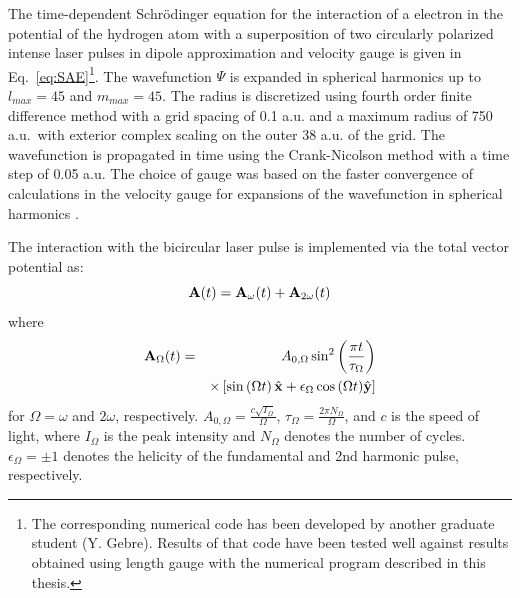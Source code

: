 

The time-dependent Schr\"odinger equation for the interaction of a electron in the potential of the hydrogen atom with a superposition of two circularly polarized intense laser pulses in dipole approximation and velocity gauge is given in Eq.~\ref{eq:SAE}\footnote{The corresponding numerical code has been developed by another graduate student (Y. Gebre). Results of that code have been tested well against results obtained using length gauge with the numerical program described in this thesis.}.
%
The wavefunction $\Psi$ is expanded in spherical harmonics up to $l_{max} = 45$ and  $m_{max} = 45$. The radius is discretized using fourth order finite difference method with a grid spacing of 0.1 a.u. and a maximum radius of 750 a.u.\ with exterior complex scaling on the outer 38 a.u. of the grid. The wavefunction is propagated in time using the Crank-Nicolson method with a time step of 0.05 a.u. The choice of gauge was based on the faster convergence of calculations in the velocity gauge for expansions of the wavefunction in spherical harmonics \cite{cormier1996,han2010}. 

The interaction with the bicircular laser pulse is implemented via the total vector potential as:
\begin{equation}
{\bf A}(t) = {\bf A}_{\omega}(t) + {\bf A}_{2\omega}(t)
\end{equation}
where
\begin{eqnarray}
{\bf A}_\Omega(t) &=& A_{0,\Omega} \sin^2\left(\frac{\pi t}{\tau_{\Omega}}\right)
    \nonumber
      \\
      && \times \left[ 
      \sin\left(\Omega t \right) {\hat{\bf x} + \epsilon_{\Omega}\cos\left(\Omega t \right)} {\hat{\bf y}} \right]
\end{eqnarray}
for $\Omega = \omega$ and $2\omega$, respectively. $A_{0,\Omega} = \frac{c\sqrt{I_\Omega}}{\Omega}$, $\tau_{\Omega} = \frac{2\pi N_{\Omega}}{\Omega}$, and $c$ is the speed of light, where $I_{\Omega}$ is the peak intensity and $N_{\Omega}$ denotes the number of cycles. $\epsilon_{\Omega} = \pm 1$ denotes the helicity of the fundamental and 2nd harmonic pulse, respectively. 

